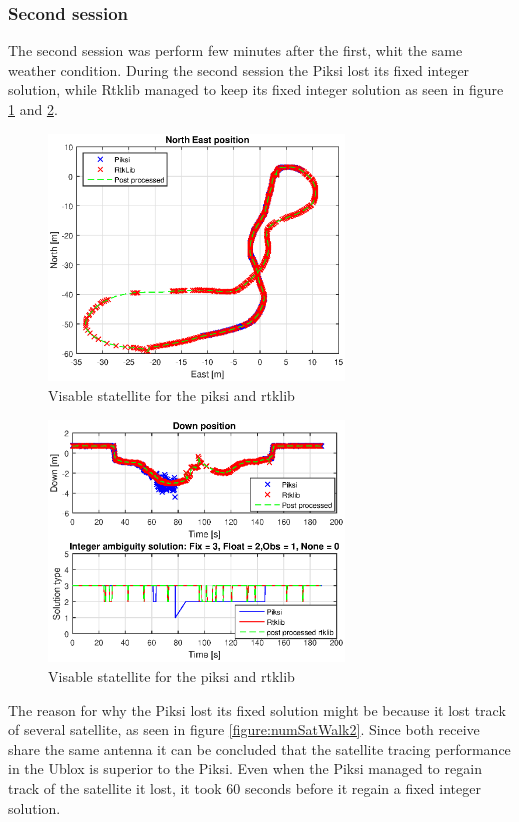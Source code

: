 \subsubsection{Second session}
The second session was perform few minutes after the first, whit the same weather condition.
During the second session the Piksi lost its fixed integer solution, while Rtklib managed to keep its fixed integer solution as seen in figure \ref{figure:xyWalk2} and \ref{figure:downWalk2}. 
\begin{figure}[H]
	\centering
		\includegraphics[width=0.7\textwidth]{figs/plots/xywalk2.eps}
		\caption{Visable statellite for the piksi and rtklib}
		\label{figure:xyWalk2}
\end{figure}
\begin{figure}[H]
	\centering
		\includegraphics[width=0.7\textwidth]{figs/plots/downWalk2.eps}
		\caption{Visable statellite for the piksi and rtklib}
		\label{figure:downWalk2}
\end{figure}
The reason for why the Piksi lost its fixed solution might be because it lost track of several satellite, as seen in figure \ref{figure:numSatWalk2}. Since both receive share the same antenna it can be concluded that the satellite tracing performance in the Ublox is superior to the Piksi.  Even when the Piksi managed to regain track of the satellite it lost, it took 60 seconds before it regain a fixed integer solution. 

